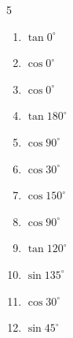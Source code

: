\begin{multicols}{5}
\begin{enumerate}
        \phantom{$\displaystyle =0$}

  \item $\displaystyle \tan{0^\circ}$

        \phantom{$\displaystyle =0$}

  \item $\displaystyle \cos{0^\circ}$

        \phantom{$\displaystyle =1$}

  \item $\displaystyle \cos{0^\circ}$

        \phantom{$\displaystyle =1$}

  \item $\displaystyle \tan{180^\circ}$

        \phantom{$\displaystyle =0$}

  \item $\displaystyle \cos{90^\circ}$

        \phantom{$\displaystyle =0$}

  \item $\displaystyle \cos{30^\circ}$


  \item $\displaystyle \cos{150^\circ}$


  \item $\displaystyle \cos{90^\circ}$

        \phantom{$\displaystyle =0$}

  \item $\displaystyle \tan{120^\circ}$


  \item $\displaystyle \sin{135^\circ}$


  \item $\displaystyle \cos{30^\circ}$


\columnbreak %

\resetques

  \item $\displaystyle \sin{45^\circ}$



\end{enumerate}
\end{multicols}
